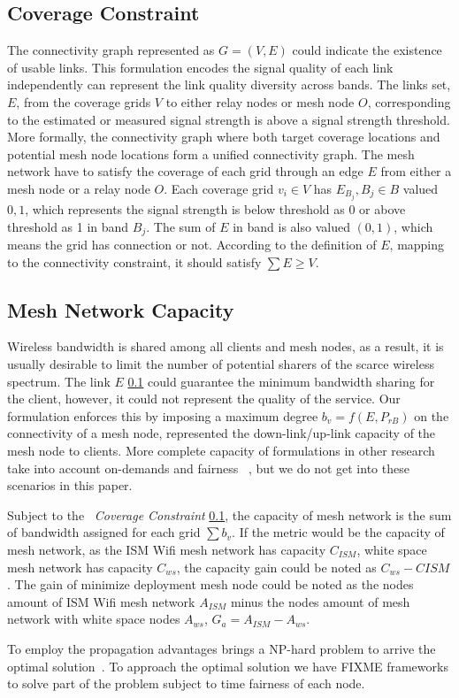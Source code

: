 \subsection{Coverage Constraint}
\label{subsec:ccconstraint}
The connectivity graph represented as $G=(V,E)$ could indicate the existence of usable links. This formulation encodes the signal quality of each link independently can represent the link quality diversity across bands.
The links set, $E$, from the coverage grids $V$ to either relay nodes or mesh node $O$, corresponding to the estimated or measured signal strength is above a signal strength threshold. 
More formally, the connectivity graph where both target coverage locations and potential mesh node locations form a unified connectivity graph.
The mesh network have to satisfy the coverage of each grid through an edge $E$ from either a mesh node or a relay node $O$.
Each coverage grid $v_i\in {V}$ has $E_{B_j},{B_j}\in {B}$ valued ${0,1}$, which represents the signal strength is below threshold as 0 or above threshold as 1 in band $B_j$.
The sum of $E$ in band is also valued $(0,1)$, which means the grid has connection or not.
According to the definition of $E$, mapping to the connectivity constraint, it should satisfy $\sum{E}\geq V$.






\subsection{Mesh Network Capacity}
Wireless bandwidth is shared among all clients and mesh nodes, as a result, it is usually desirable to limit the number of potential sharers of the scarce wireless spectrum. 
The link $E$ \ref{subsec:ccconstraint} could guarantee the minimum bandwidth sharing for the client, however, it could not represent the quality of the service. Our formulation enforces this by imposing a maximum degree $b_v=f(E,P_{rB})$ on the connectivity of a mesh node, represented the down-link/up-link capacity of the mesh node to clients. More complete capacity of formulations in other research take into account on-demands and fairness ~\cite{arkoulis2013optimal}, but we do not get into these scenarios in this paper.


Subject to the ~\emph{Coverage Constraint} \ref{subsec:ccconstraint}, the capacity of mesh network is the sum of bandwidth assigned for each grid $\sum{b_v}$. If the metric would be the capacity of mesh network, as the ISM Wifi mesh network has capacity $C_{ISM}$, white space mesh network has capacity $C_{ws}$, the capacity gain could be noted as $C_{ws}-C{ISM}$.
The gain of minimize deployment mesh node could be noted as the nodes amount of ISM Wifi mesh network $A_{ISM}$ minus the nodes amount of mesh network with white space nodes $A_{ws}$, $G_a=A_{ISM}-A_{ws}$.


To employ the propagation advantages brings a NP-hard problem to arrive the optimal solution~\cite{arkoulis2013optimal}. 
To approach the optimal solution we have FIXME frameworks to solve part of the problem subject to time fairness of each node.




